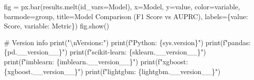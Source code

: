 \documentclass[
  letterpaper,
  DIV=11,
  numbers=noendperiod]{scrartcl}
\newenvironment{Shaded}{\begin{snugshade}}{\end{snugshade}}
\newcommand{\BuiltInTok}[1]{\textcolor[rgb]{0.00,0.23,0.31}{#1}}
\newcommand{\CharTok}[1]{\textcolor[rgb]{0.13,0.47,0.30}{#1}}
\newcommand{\CommentTok}[1]{\textcolor[rgb]{0.37,0.37,0.37}{#1}}
\newcommand{\NormalTok}[1]{\textcolor[rgb]{0.00,0.23,0.31}{#1}}
\newcommand{\OperatorTok}[1]{\textcolor[rgb]{0.37,0.37,0.37}{#1}}
\newcommand{\SpecialCharTok}[1]{\textcolor[rgb]{0.37,0.37,0.37}{#1}}
\newcommand{\SpecialStringTok}[1]{\textcolor[rgb]{0.13,0.47,0.30}{#1}}
\newcommand{\StringTok}[1]{\textcolor[rgb]{0.13,0.47,0.30}{#1}}
\begin{document}
\begin{Shaded}
\begin{Highlighting}[]
\NormalTok{fig }\OperatorTok{=}\NormalTok{ px.bar(results.melt(id\_vars}\OperatorTok{=}\StringTok{\textquotesingle{}Model\textquotesingle{}}\NormalTok{),}
\NormalTok{             x}\OperatorTok{=}\StringTok{\textquotesingle{}Model\textquotesingle{}}\NormalTok{, y}\OperatorTok{=}\StringTok{\textquotesingle{}value\textquotesingle{}}\NormalTok{, color}\OperatorTok{=}\StringTok{\textquotesingle{}variable\textquotesingle{}}\NormalTok{,}
\NormalTok{             barmode}\OperatorTok{=}\StringTok{\textquotesingle{}group\textquotesingle{}}\NormalTok{, title}\OperatorTok{=}\StringTok{\textquotesingle{}Model Comparison (F1 Score vs AUPRC)\textquotesingle{}}\NormalTok{,}
\NormalTok{             labels}\OperatorTok{=}\NormalTok{\{}\StringTok{\textquotesingle{}value\textquotesingle{}}\NormalTok{: }\StringTok{\textquotesingle{}Score\textquotesingle{}}\NormalTok{, }\StringTok{\textquotesingle{}variable\textquotesingle{}}\NormalTok{: }\StringTok{\textquotesingle{}Metric\textquotesingle{}}\NormalTok{\})}
\NormalTok{fig.show()}

    
    
    
    
    
    
    

    \CommentTok{\# Version info}
    \BuiltInTok{print}\NormalTok{(}\StringTok{"}\CharTok{\textbackslash{}n}\StringTok{Versions:"}\NormalTok{)}
    \BuiltInTok{print}\NormalTok{(}\SpecialStringTok{f"Python: }\SpecialCharTok{\{}\NormalTok{sys}\SpecialCharTok{.}\NormalTok{version}\SpecialCharTok{\}}\SpecialStringTok{"}\NormalTok{)}
    \BuiltInTok{print}\NormalTok{(}\SpecialStringTok{f"pandas: }\SpecialCharTok{\{}\NormalTok{pd}\SpecialCharTok{.}\NormalTok{\_\_version\_\_}\SpecialCharTok{\}}\SpecialStringTok{"}\NormalTok{)}
    \BuiltInTok{print}\NormalTok{(}\SpecialStringTok{f"scikit{-}learn: }\SpecialCharTok{\{}\NormalTok{sklearn}\SpecialCharTok{.}\NormalTok{\_\_version\_\_}\SpecialCharTok{\}}\SpecialStringTok{"}\NormalTok{)}
    \BuiltInTok{print}\NormalTok{(}\SpecialStringTok{f"imblearn: }\SpecialCharTok{\{}\NormalTok{imblearn}\SpecialCharTok{.}\NormalTok{\_\_version\_\_}\SpecialCharTok{\}}\SpecialStringTok{"}\NormalTok{)}
    \BuiltInTok{print}\NormalTok{(}\SpecialStringTok{f"xgboost: }\SpecialCharTok{\{}\NormalTok{xgboost}\SpecialCharTok{.}\NormalTok{\_\_version\_\_}\SpecialCharTok{\}}\SpecialStringTok{"}\NormalTok{)}
    \BuiltInTok{print}\NormalTok{(}\SpecialStringTok{f"lightgbm: }\SpecialCharTok{\{}\NormalTok{lightgbm}\SpecialCharTok{.}\NormalTok{\_\_version\_\_}\SpecialCharTok{\}}\SpecialStringTok{"}\NormalTok{)}


\end{Highlighting}
\end{Shaded}
\end{document}

